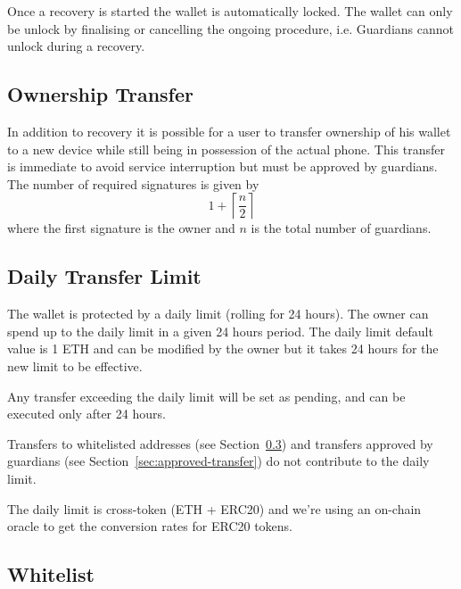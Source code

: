 \documentclass[12pt]{article}
\begin{document}
Once a recovery is started the wallet is automatically locked. The wallet can only be unlock by finalising or cancelling the ongoing procedure, i.e. Guardians cannot unlock during a recovery.

\subsection{Ownership Transfer}

In addition to recovery it is possible for a user to transfer ownership of his wallet to a new device while still being in possession of the actual phone. This transfer is immediate to avoid service interruption but must be approved by guardians. The number of required signatures is given by
\begin{equation*}
    1+\left\lceil {\frac{n}{2}} \right\rceil
\end{equation*}
where the first signature is the owner and $n$ is the total number of guardians.

\subsection{Daily Transfer Limit}
\label{sec:dailylimit}
The wallet is protected by a daily limit (rolling for 24 hours). The owner can spend up to the daily limit in a given 24 hours period. The daily limit default value is 1 ETH and can be modified by the owner but it takes 24 hours for the new limit to be effective.

Any transfer exceeding the daily limit will be set as pending, and can be executed only after 24 hours.

Transfers to whitelisted addresses (see Section~\ref{sec:whitelist}) and transfers approved by guardians (see Section~\ref{sec:approved-transfer}) do not contribute to the daily limit.

The daily limit is cross-token (ETH + ERC20) and we're using an on-chain oracle to get the conversion rates for ERC20 tokens.

\subsection{Whitelist}
\label{sec:whitelist}
\end{document}
